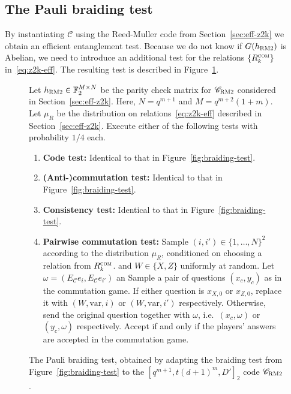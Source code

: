 \documentclass[11pt]{article}
\theoremstyle{definition}
\newcommand{\code}{\mathscr{C}}
\newcommand{\F}{\ensuremath{\mathbb{F}}}
\newcommand{\com}{\textsc{com}}
\newcommand{\bRM}{\ensuremath{\textsc{RM2}}}
\newcommand{\var}{\mathrm{var}}
\newenvironment{gamespec}{
  \begin{mdframed}[style=figstyle]}{
  \end{mdframed}}
\begin{document}
\subsection{The Pauli braiding test}
\label{sec:pbt}

By instantiating $\code$ using the Reed-Muller code from Section~\ref{sec:eff-z2k} we obtain an efficient entanglement test.  Because we do not know if $G(h_\bRM)$ is Abelian, we need to introduce an additional test for the relations $\{R_k^\com\}$ in~\eqref{eq:z2k-eff}. The resulting test is described in Figure~\ref{fig:pbt}.

\begin{figure}[!htbp]
  \centering
  \begin{gamespec}
Let $h_\bRM\in \F_2^{M\times N}$ be the parity check matrix for $\code_\bRM$ considered in Section~\ref{sec:eff-z2k}. Here, $N=q^{m+1}$ and $M=q^{m+2}(1+m)$. Let $\mu_R$ be the distribution on relations~\eqref{eq:z2k-eff} described in Section~\ref{sec:eff-z2k}. Execute either of the following tests with probability $1/4$ each. 
    \begin{enumerate}
      \setlength\itemsep{1pt}
    \item \textbf{Code test:} Identical to that in Figure~\ref{fig:braiding-test}.
    \item \textbf{(Anti-)commutation test:} Identical to that in Figure~\ref{fig:braiding-test}.
		 \item \textbf{Consistency test:} Identical to that in Figure~\ref{fig:braiding-test}.
		\item \textbf{Pairwise commutation test:} Sample $(i,i')\in \{1,\ldots,N\}^2$ according to the distribution $\mu_R$, conditioned on choosing a relation from $R_k^\com$. and $W\in \{X,Z\}$ uniformly at random. 	
		Let $\omega=(E_\code e_{i}, E_\code e_{i'})$ an 
		Sample a pair of questions $(x_c,y_c)$ as in the commutation game. If either question is $x_{X,0}$ or $x_{Z,0}$, replace it with $(W,\var,i)$ or $(W,\var,i')$ respectively. Otherwise, send the original question together with $\omega$, i.e.\ $(x_c,\omega)$ or $(y_c,\omega)$ respectively. Accept if and only if the players' answers are accepted in the commutation game.  
    \end{enumerate}
  \end{gamespec}
  \caption{The Pauli braiding test, obtained by adapting the braiding test from Figure~\ref{fig:braiding-test} to the $[q^{m+1},t(d+1)^m,D']_2$ code $\code_\bRM$.}
  \label{fig:pbt}
	
\end{figure}
\end{document}
